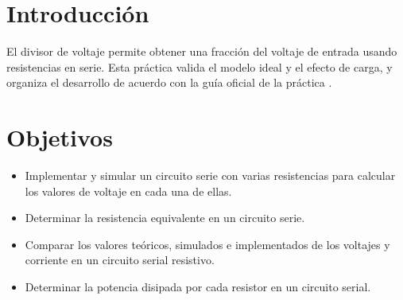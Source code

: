 \documentclass[conference]{IEEEtran}
\title{\titulo}
\author{\IEEEauthorblockN{\autorA\,\IEEEauthorrefmark{1}, \autorB\,\IEEEauthorrefmark{1}}\IEEEauthorblockA{\IEEEauthorrefmark{1}\afiliacion\\ Email: \{\correoA,\,\correoB\}}}
\begin{document}
\maketitle

\begin{abstract}
Se implement\'o y analiz\'o un divisor de voltaje resistivo de cinco elementos, contrastando resultados te\'oricos, simulados (Proteus) y medidos en laboratorio. Primero se verific\'o la relaci\'on ideal de divisi\'on y se cuantific\'o el efecto de carga al considerar la impedancia de medici\'on. Se registraron tensiones, corrientes y potencias por resistencia, y se compararon con los c\'alculos correspondientes. Adem\'as, se resolvi\'o un ejercicio de dise\~no imponiendo particiones de tensi\'on 1/2, 1/4, 1/8 y 1/16 en la cadena, obteniendo relaciones de resistencias 8:4:2:1:1 a partir de $R_1=2.1\,\mathrm{M\Omega}$ y $V_{in}=9\,\mathrm{V}$. Las discrepancias entre metodolog\'ias fueron coherentes con tolerancias de componentes e incertidumbre instrumental.
\end{abstract}


\section{Introducción}
El divisor de voltaje permite obtener una fracción del voltaje de entrada usando resistencias en serie. Esta práctica valida el modelo ideal y el efecto de carga, y organiza el desarrollo de acuerdo con la guía oficial de la práctica \cite{ref:guia}.

\section{Objetivos}
\begin{itemize}
  \item Implementar y simular un circuito serie con varias resistencias para calcular los valores de voltaje en cada una de ellas.
  \item Determinar la resistencia equivalente en un circuito serie.
  \item Comparar los valores te\'oricos, simulados e implementados de los voltajes y corriente en un circuito serial resistivo.
  \item Determinar la potencia disipada por cada resistor en un circuito serial.
\end{itemize}

\end{document}
